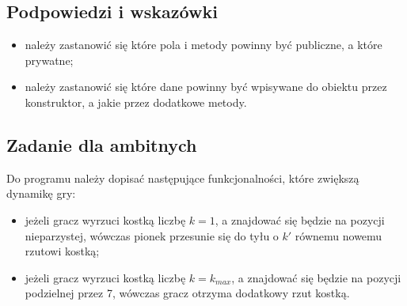 \documentclass{article}
\begin{document}
	\subsection{Podpowiedzi i wskazówki}
	\begin{itemize}
		\item należy zastanowić się które pola i metody powinny być publiczne, a które prywatne;
		\item należy zastanowić się które dane powinny być wpisywane do obiektu przez konstruktor, a jakie przez dodatkowe metody.
	\end{itemize}

	\subsection{Zadanie dla ambitnych}
	Do programu należy dopisać następujące funkcjonalności, które zwiększą dynamikę gry:
	\begin{itemize}
		\item jeżeli gracz wyrzuci kostką liczbę $k = 1$, a znajdować się będzie na pozycji nieparzystej, wówczas pionek przesunie się do tyłu o $k'$ równemu nowemu rzutowi kostką;
		\item jeżeli gracz wyrzuci kostką liczbę $k = k_{max}$, a znajdować się będzie na pozycji podzielnej przez 7, wówczas gracz otrzyma dodatkowy rzut kostką.
	\end{itemize}
\end{document}

